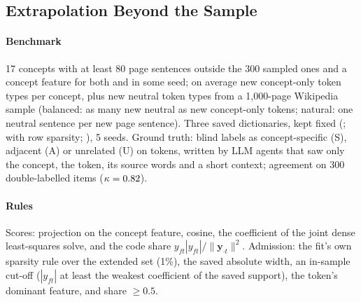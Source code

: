 \subsection{Extrapolation Beyond the Sample}
\label{app:extrapolation}
\paragraph{Benchmark}
17 concepts with at least 80 page sentences outside the 300 sampled ones and a concept feature for both \ember{} and \cinder{} in some seed; on average  new concept-only token types per concept, plus new neutral token types from a 1{,}000-page Wikipedia sample (balanced: as many new neutral as new concept-only tokens; natural: one neutral sentence per new page sentence).
Three saved dictionaries, kept fixed (\ember{}; \cs{} with row sparsity; \cinder{}), 5 seeds.
Ground truth: blind labels as concept-specific (S), adjacent (A) or unrelated (U) on  tokens, written by LLM agents that saw only the concept, the token, its source words and a short context; agreement on 300 double-labelled items  ($\kappa = 0.82$).

\paragraph{Rules}
Scores: projection on the concept feature, cosine, the coefficient of the joint dense least-squares solve, and the code share $y_{ft}|y_{ft}|/\|\mathbf y_{\cdot t}\|^2$.
Admission: the fit's own sparsity rule over the extended set (1\%), the saved absolute width, an in-sample cut-off ($|y_{ft}|$ at least the weakest coefficient of the saved support), the token's dominant feature, and share $\ge 0.5$.


